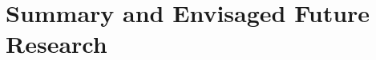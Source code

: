 \documentclass{book}
\begin{document}
\chapter*{Summary and Envisaged Future Research}
	
\end{document}
